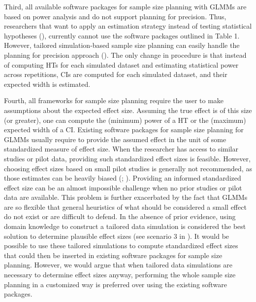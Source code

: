 \documentclass[
  man,
  floatsintext,
  longtable,
  a4paper,
  nolmodern,
  notxfonts,
  notimes,
  colorlinks=true,linkcolor=blue,citecolor=blue,urlcolor=blue]{apa7}
\begin{document}
Third, all available software packages for sample size planning with
GLMMs are based on power analysis and do not support planning for
precision. Thus, researchers that want to apply an estimation strategy
instead of testing statistical hypotheses
(), currently
cannot use the software packages outlined in Table 1. However, tailored
simulation-based sample size planning can easily handle the planning for
precision approach (). The only change in procedure is that instead of
computing HTs for each simulated dataset and estimating statistical
power across repetitions, CIs are computed for each simulated dataset,
and their expected width is estimated.

Fourth, all frameworks for sample size planning require the user to make
assumptions about the expected effect size. Assuming the true effect is
of this size (or greater), one can compute the (minimum) power of a HT
or the (maximum) expected width of a CI. Existing software packages for
sample size planning for GLMMs usually require to provide the assumed
effect in the unit of some standardized measure of effect size. When the
researcher has access to similar studies or pilot data, providing such
standardized effect sizes is feasible. However, choosing effect sizes
based on small pilot studies is generally not recommended, as those
estimates can be heavily biased
(;
).
Providing an informed standardized effect size can be an almost
impossible challenge when no prior studies or pilot data are available.
This problem is further exacerbated by the fact that GLMMs are so
flexible that general heuristics of what should be considered a small
effect do not exist or are difficult to defend. In the absence of prior
evidence, using domain knowledge to construct a tailored data simulation
is considered the best solution to determine plausible effect sizes (see
scenario 3 in ). It would be possible to use these tailored simulations
to compute standardized effect sizes that could then be inserted in
existing software packages for sample size planning. However, we would
argue that when tailored data simulations are necessary to determine
effect sizes anyway, performing the whole sample size planning in a
customized way is preferred over using the existing software packages.
\end{document}

